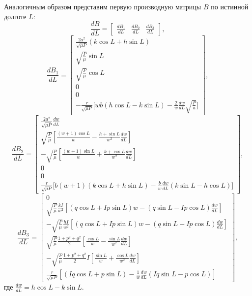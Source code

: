 Аналогичным образом представим первую производную матрицы $B$ по истинной долготе $L$: 
\begin{equation*}
    \frac{dB}{dL} = 
    \begin{bmatrix}
        \frac{dB_1}{dL} & \frac{dB_2}{dL} & \frac{dB_3}{dL}
    \end{bmatrix},
\end{equation*}
\begin{equation*}
    \frac{dB_1}{dL} = 
    \begin{bmatrix}
        \frac{2a^{2}}{\sqrt{\mu P}}(k\cos L + h \sin L) \\
        \sqrt{\frac{P}{\mu}} \sin L \\
        \sqrt{\frac{P}{\mu}} \cos L \\ 
        0 \\
        0 \\
        -\frac{r}{\sqrt{\mu P}} \bigl[ wb (h \cos L - k \sin L) - \frac{2}{w} \frac{dw}{dL} \sqrt{\frac{P}{a}} \bigr]
    \end{bmatrix},
\end{equation*}
\begin{equation*}
    \frac{dB_2}{dL} = 
    \begin{bmatrix}
        \frac{2a^{2}}{\sqrt{\mu P}} \frac{dw}{dL} \\
        \sqrt{\frac{P}{\mu}} \left[ \frac{(w + 1) \cos L}{w} - \frac{h + \sin L}{w^2} \frac{dw}{dL} \right] \\
        -\sqrt{\frac{P}{\mu}} \left[ \frac{(w + 1) \sin L}{w} + \frac{k + \cos L}{w^2} \frac{dw}{dL} \right] \\
        0 \\
        0 \\
        \frac{r}{\sqrt{\mu P}} \bigl[ b (w + 1) (k \cos L + h \sin L) - \frac{b}{w} \frac{dw}{dL} (k \sin L - h \cos L) \bigr]
    \end{bmatrix},
\end{equation*}
\begin{equation*}
    \frac{dB_3}{dL} = 
    \begin{bmatrix}
        0 \\
        \sqrt{\frac{P}{\mu}} \frac{kI}{w^2} \left[ (q \cos L + I p \sin L) w - (q \sin L - I p \cos L) \frac{dw}{dL} \right] \\
        -\sqrt{\frac{P}{\mu}} \frac{hI}{w^2} \left[ (q \cos L + I p \sin L) w - (q \sin L - I p \cos L) \frac{dw}{dL} \right] \\
        \sqrt{\frac{P}{\mu}} \frac{1 + p^2 + q^2}{2} \left[ \frac{\cos L}{w} - \frac{\sin L}{w^2} \frac{dw}{dL} \right] \\
        -\sqrt{\frac{P}{\mu}} \frac{1 + p^2 + q^2}{2} I \left[ \frac{\sin L}{w} + \frac{\cos L}{w^2} \frac{dw}{dL} \right] \\
        \frac{r}{\sqrt{\mu P}} \left[ (Iq \cos L + p \sin L) - \frac{1}{w} \frac{dw}{dL} (Iq \sin L - p \cos L) \right]
    \end{bmatrix},
\end{equation*}
где $\frac{dw}{dL} = h \cos L - k \sin L $.

